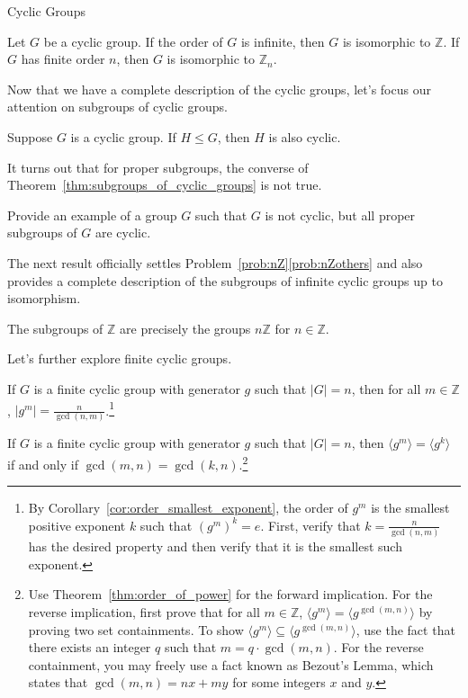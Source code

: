 \begin{section}{Cyclic Groups}
\begin{theorem}
Let $G$ be a cyclic group. If the order of $G$ is infinite, then $G$ is isomorphic to $\mathbb{Z}$. If $G$ has finite order $n$, then $G$ is isomorphic to $\mathbb{Z}_n$.
\end{theorem}

Now that we have a complete description of the cyclic groups, let's focus our attention on subgroups of cyclic groups.  

\begin{theorem}\label{thm:subgroups_of_cyclic_groups}
Suppose $G$ is a cyclic group. If $H\leq G$, then $H$ is also cyclic.
\end{theorem}

It turns out that for proper subgroups, the converse of Theorem~\ref{thm:subgroups_of_cyclic_groups} is not true.

\begin{problem}
Provide an example of a group $G$ such that $G$ is not cyclic, but all proper subgroups of $G$ are cyclic.
\end{problem}

The next result officially settles Problem~\ref{prob:nZ}\ref{prob:nZothers} and also provides a complete description of the subgroups of infinite cyclic groups up to isomorphism.

\begin{corollary}\label{cor:subgroups_of_Z}
The subgroups of $\mathbb{Z}$ are precisely the groups $n\mathbb{Z}$ for $n\in \mathbb{Z}$.
\end{corollary}

Let's further explore finite cyclic groups.

\begin{theorem}\label{thm:order_of_power}
If $G$ is a finite cyclic group with generator $g$ such that $|G|=n$, then for all $m\in\mathbb{Z}$, $\displaystyle |g^m|=\frac{n}{\gcd(n,m)}$.\footnote{By Corollary~\ref{cor:order_smallest_exponent}, the order of $g^m$ is the smallest positive exponent $k$ such that $(g^m)^k=e$. First, verify that $k=\frac{n}{\gcd(n,m)}$ has the desired property and then verify that it is the smallest such exponent.}
\end{theorem}

\begin{theorem}
If $G$ is a finite cyclic group with generator $g$ such that $|G|=n$, then $\langle g^m\rangle=\langle g^k\rangle$ if and only if $\gcd(m,n)=\gcd(k,n)$.\footnote{Use Theorem~\ref{thm:order_of_power} for the forward implication. For the reverse implication, first prove that for all $m\in\mathbb{Z}$, $\langle g^m\rangle=\langle g^{\gcd(m,n)}\rangle$ by proving two set containments. To show $\langle g^m\rangle\subseteq \langle g^{\gcd(m,n)}\rangle$, use the fact that there exists an integer $q$ such that $m=q\cdot \gcd(m,n)$. For the reverse containment, you may freely use a fact known as Bezout's Lemma, which states that $\gcd(m,n)=nx+my$ for some integers $x$ and $y$.}
\end{theorem}


\end{section}
